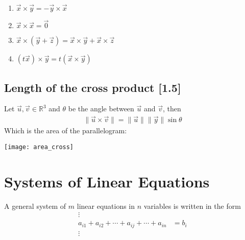 \documentclass[a4paper,9pt]{extarticle}
\begin{document}
\begin{multicols*}{2}
\begin{enumerate}[label=\bfseries (\arabic*)] \itemsep0pt \parskip0pt 
    \item $\vec{x} \times \vec{y} = -\vec{y} \times \vec{x}$
    \item $\vec{x} \times \vec{x} = \vec{0}$
    \item $\vec{x} \times (\vec{y} + \vec{z}) = \vec{x} \times \vec{y} + \vec{x} \times \vec{z}$
    \item $(t \vec{x}) \times \vec{y} = t(\vec{x} \times \vec{y})$
\end{enumerate}


\subsection{Length of the cross product [1.5]}
Let $\vec{u}, \vec{v} \in \mathbb{R}^3$ and $\theta$ be the angle between $\vec{u}$ and $\vec{v}$, then
\begin{equation} \label{1.5-2}
    \begin{split}
        \|\vec{u} \times \vec{v}\| = \|\vec{u}\| \|\vec{y}\| \sin{\theta}
    \end{split}
\end{equation}
Which is the area of the parallelogram:

{\centering \texttt{[image: area\_cross]} \par}




\section{Systems of Linear Equations}
A general system of $m$ linear equations in $n$ variables is written in the form
\begin{equation} \label{2.1-1}
    \begin{split}
        \vdots & \\
        a_{i1} + a_{i2} + \cdots + a_{ij} + \cdots + a_{in} & = b_i \\
        \vdots &
    \end{split}
\end{equation}


\end{multicols*}
\end{document}

